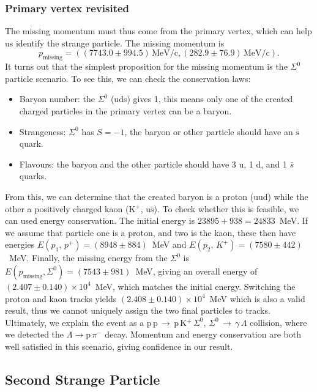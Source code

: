 \documentclass[twocolumn]{article}
\begin{document}
\subsubsection{Primary vertex revisited}
The missing momentum must thus come from the primary vertex, which can help us identify the strange particle. The missing momentum is
\begin{equation}
p_{\text{missing}} = ( (7743.0 \pm 994.5)\, \text{MeV/c,} \, (282.9 \pm 76.9) \, \text{MeV/c} ). \nonumber
\end{equation}
It turns out that the simplest proposition for the missing momentum is the $\Sigma^0$ particle scenario. To see this, we can check the conservation laws:
\begin{itemize}
	\item Baryon number: the $\Sigma^0$ (uds) gives 1, this means only one of the created charged particles in the primary vertex can be a baryon.
	\item Strangeness: $\Sigma^0$ has $S = -1$, the baryon or other particle should have an $\bar{\text{s}}$ quark.
	\item Flavours: the baryon and the other particle should have 3 u, 1 d, and 1 $\bar{s}$ quarks.
\end{itemize}
From this, we can determine that the created baryon is a proton (uud) while the other a positively charged kaon (K$^+$, u$\bar{\text{s}}$). To check whether this is feasible, we can used energy conservation. The initial energy is $23895 + 938 = 24833$~MeV. If we assume that particle one is a proton, and two is the kaon, these then have energies $E(p_1, \, p^+) = (8948 \pm 884)$~MeV and $E(p_2, \, K^+) = (7580 \pm 442)$~MeV. Finally, the missing energy from the $\Sigma^0$ is $E(p_{\text{missing}}, \Sigma^0) = (7543 \pm 981)$~MeV, giving an overall energy of $(2.407 \pm 0.140)\times 10^4$~MeV, which matches the initial energy. Switching the proton and kaon tracks yields $(2.408 \pm 0.140)\times 10^4$~MeV which is also a valid result, thus we cannot uniquely assign the two final particles to tracks. Ultimately, we explain the event as a p$\,$p$\,\rightarrow\,$p$\,$K$^+\,\Sigma^0,\,\Sigma^0 \, \rightarrow \, \gamma \, \Lambda$ collision, where we detected the $\Lambda\rightarrow \text{p}\, \pi^-$ decay. Momentum and energy conservation are both well satisfied in this scenario, giving confidence in our result.

\subsection{Second Strange Particle}
\end{document}
